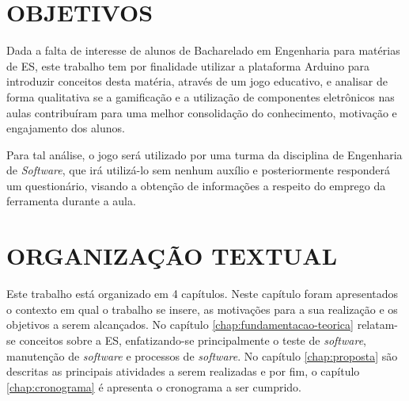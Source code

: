 \section{OBJETIVOS}
\label{sec:objetivos}

 Dada a falta de interesse de alunos de Bacharelado em Engenharia para matérias de ES, este trabalho tem por finalidade utilizar a plataforma Arduino para introduzir conceitos desta matéria, através de um jogo educativo, e analisar de forma qualitativa se a gamificação e a utilização de componentes eletrônicos nas aulas contribuíram para uma melhor consolidação do conhecimento, motivação e engajamento dos alunos.
 
 Para tal análise, o jogo será utilizado por uma turma da disciplina de Engenharia de \textit{Software}, que irá utilizá-lo sem nenhum auxílio e posteriormente responderá um questionário, visando a obtenção de informações a respeito do emprego da ferramenta durante a aula.
 
 \section{ORGANIZAÇÃO TEXTUAL}
 \label{sec:orgTextual}
 
Este trabalho está organizado em 4 capítulos. Neste capítulo foram apresentados o contexto em qual o trabalho se insere, as motivações para a sua realização e os objetivos a serem alcançados. No capítulo \ref{chap:fundamentacao-teorica} relatam-se conceitos sobre a ES, enfatizando-se principalmente o teste de \textit{software}, manutenção de \textit{software} e processos de \textit{software}. No capítulo \ref{chap:proposta} são descritas as principais atividades a serem realizadas e por fim, o capítulo \ref{chap:cronograma} é apresenta o cronograma a ser cumprido.